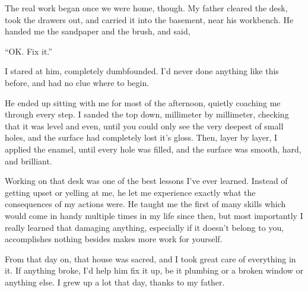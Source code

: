 \documentclass[letterpaper]{article}
\begin{document}
	The real work began once we were home, though. My father cleared the desk, took the drawers out, and carried it into the basement, near his workbench. He handed me the sandpaper and the brush, and said,

	``OK. Fix it.''

	I stared at him, completely dumbfounded. I'd never done anything like this before, and had no clue where to begin.

	He ended up sitting with me for most of the afternoon, quietly coaching me through every step. I sanded the top down, millimeter by millimeter, checking that it was level and even, until you could only see the very deepest of small holes, and the surface had completely lost it's gloss. Then, layer by layer, I applied the enamel, until every hole was filled, and the 
surface was smooth, hard, and brilliant.
	
	Working on that desk was one of the best lessons I've ever learned. Instead of getting upset or yelling at me, he let me experience exactly what the consequences of my actions were. He taught me the first of many skills which would come in handy multiple times in my life since then, but most importantly I really learned that damaging anything, especially if it doesn't belong to you, accomplishes nothing besides makes more work for yourself.

	From that day on, that house was sacred, and I took great care of everything in it. If anything broke, I'd help him fix it up, be it plumbing or a broken window or anything else. I grew up a lot that day, thanks to my father.
\end{document}
